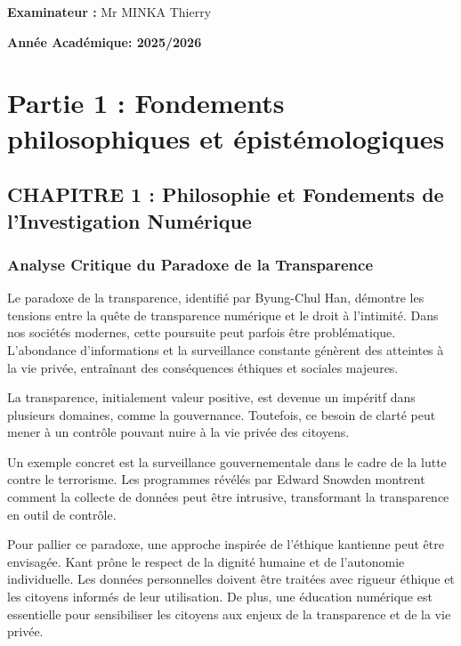 \documentclass[12pt,a4paper]{article}
\begin{document}
\vspace{1.5cm}

\noindent
\textbf{Examinateur :} \quad Mr MINKA Thierry 

\vfill

\begin{center}
  \Large \textbf{Ann\'ee Acad\'emique: 2025/2026}
\end{center}

\newpage

\section*{Partie 1 : Fondements philosophiques et \'epist\'emologiques}

\subsection*{CHAPITRE 1 : Philosophie et Fondements de l'Investigation Num\'erique}

\subsubsection*{Analyse Critique du Paradoxe de la Transparence}

Le paradoxe de la transparence, identifi\'e par Byung-Chul Han, d\'emontre les tensions entre la qu\^ete de transparence num\'erique et le droit \`a l'intimit\'e. Dans nos soci\'et\'es modernes, cette poursuite peut parfois \^etre probl\'ematique. L'abondance d'informations et la surveillance constante g\'en\`erent des atteintes \`a la vie priv\'ee, entra\^inant des cons\'equences \'ethiques et sociales majeures.

La transparence, initialement valeur positive, est devenue un imp\'eritf dans plusieurs domaines, comme la gouvernance. Toutefois, ce besoin de clart\'e peut mener \`a un contr\^ole pouvant nuire \`a la vie priv\'ee des citoyens.  

Un exemple concret est la surveillance gouvernementale dans le cadre de la lutte contre le terrorisme. Les programmes r\'ev\'el\'es par Edward Snowden montrent comment la collecte de donn\'ees peut \^etre intrusive, transformant la transparence en outil de contr\^ole.  

Pour pallier ce paradoxe, une approche inspir\'ee de l'\'ethique kantienne peut \^etre envisag\'ee. Kant pr\^one le respect de la dignit\'e humaine et de l'autonomie individuelle. Les donn\'ees personnelles doivent \^etre trait\'ees avec rigueur \'ethique et les citoyens inform\'es de leur utilisation. De plus, une \'education num\'erique est essentielle pour sensibiliser les citoyens aux enjeux de la transparence et de la vie priv\'ee.
\end{document}

